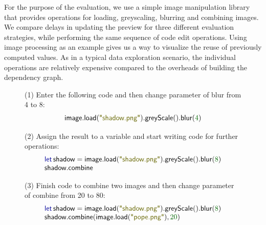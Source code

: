 \documentclass[english,crc]{programming}
\theoremstyle{plain}
\theoremstyle{definition}
\newcommand{\num}[1]{\textcolor{numclr}{#1}}
\newcommand{\str}[1]{\textnormal{\textcolor{strclr}{\sffamily "#1"}}}
\newcommand{\ident}[1]{\textnormal{\textcolor{idclr}{\sffamily #1}}}
\newcommand{\kvd}[1]{\textnormal{\textcolor{kvdclr}{\sffamily #1}}}
\begin{document}
For the purpose of the evaluation, we use a simple image manipulation library that provides
operations for loading, greyscaling, blurring and combining images. We compare delays in
updating the preview for three different evaluation strategies, while performing the same
sequence of code edit operations. Using image processing as an example gives us a way to
visualize the reuse of previously computed values. As in a typical data exploration scenario,
the individual operations are relatively expensive compared to the overheads of building the
dependency graph.


\begin{figure}
\raggedright
\vspace{-0.5em}
{\small\sffamily (1) Enter the following code and then change parameter of blur from 4 to 8:}
\vspace{-0.5em}
\begin{equation*}
\begin{array}{l}
\ident{image}.\ident{load}(\str{shadow.png}).\ident{greyScale}().\ident{blur}(\num{4})
\end{array}
\end{equation*}

{\small\sffamily (2) Assign the result to a variable and start writing code for further operations:}
\vspace{-0.5em}
\begin{equation*}
\begin{array}{l}
\kvd{let}\,\ident{shadow}=\ident{image}.\ident{load}(\str{shadow.png}).\ident{greyScale}().\ident{blur}(\num{8})\\
\ident{shadow}.\ident{combine}
\end{array}
\end{equation*}

{\small\sffamily (3) Finish code to combine two images and then change parameter of combine from 20 to 80:}
\vspace{-0.5em}
\begin{equation*}
\begin{array}{l}
\kvd{let}\,\ident{shadow}=\ident{image}.\ident{load}(\str{shadow.png}).\ident{greyScale}().\ident{blur}(\num{8})\\
\ident{shadow}.\ident{combine}(\ident{image}.\ident{load}(\str{pope.png}), \num{20})
\end{array}
\end{equation*}


\end{figure}
\end{document}
